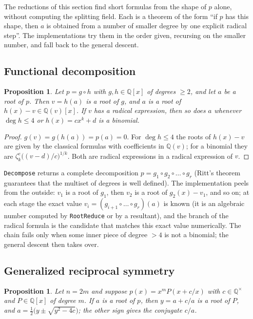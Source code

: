 \documentclass[11pt,a4paper]{article}
\newtheorem{proposition}[theorem]{Proposition}
\theoremstyle{definition}
\theoremstyle{remark}
\newcommand{\Q}{\mathbb{Q}}
\newcommand{\code}[1]{\texttt{#1}}
\begin{document}
The reductions of this section find short formulas from the shape of $p$ alone, without
computing the splitting field.  Each is a theorem of the form ``if $p$ has this shape,
then $a$ is obtained from a number of smaller degree by one explicit radical step''.
The implementations try them in the order given, recursing on the smaller number, and
fall back to the general descent.

\subsection{Functional decomposition}

\begin{proposition}\label{prop:decompose}
Let $p=g\circ h$ with $g,h\in\Q[x]$ of degrees $\ge2$, and let $a$ be a root of $p$.
Then $v=h(a)$ is a root of $g$, and $a$ is a root of $h(x)-v\in\Q(v)[x]$.  If $v$ has a
radical expression, then so does $a$ whenever $\deg h\le4$ or $h(x)=cx^k+d$ is a
binomial.
\end{proposition}

\begin{proof}
$g(v)=g(h(a))=p(a)=0$.  For $\deg h\le4$ the roots of $h(x)-v$ are given by the
classical formulas with coefficients in $\Q(v)$; for a binomial they are
$\zeta_k^{e}\bigl((v-d)/c\bigr)^{1/k}$.  Both are radical expressions in a radical
expression of $v$.
\end{proof}

\code{Decompose} returns a complete decomposition $p=g_1\circ g_2\circ\dots\circ g_r$
(Ritt's theorem guarantees that the multiset of degrees is well defined).  The
implementation peels from the outside: $v_1$ is a root of $g_1$, then $v_2$ is a root of
$g_2(x)-v_1$, and so on; at each stage the exact value $v_i=(g_{i+1}\circ\dots\circ g_r)(a)$
is known (it is an algebraic number computed by \code{RootReduce} or by a resultant), and
the branch of the radical formula is the candidate that matches this exact value
numerically.  The chain fails only when some inner piece of degree $>4$ is not a
binomial; the general descent then takes over.

\subsection{Generalized reciprocal symmetry}\label{sec:reciprocal}

\begin{proposition}\label{prop:reciprocal}
Let $n=2m$ and suppose $p(x)=x^mP(x+c/x)$ with $c\in\Q^\times$ and $P\in\Q[x]$ of
degree $m$.  If $a$ is a root of $p$, then $y=a+c/a$ is a root of $P$, and
$a=\tfrac12\bigl(y\pm\sqrt{y^2-4c}\bigr)$; the other sign gives the conjugate $c/a$.
\end{proposition}
\end{document}
